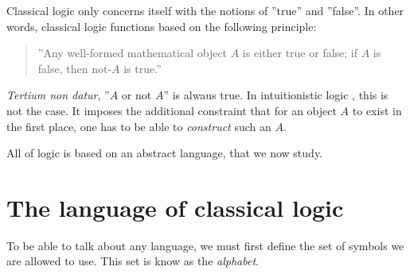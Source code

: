 \documentclass[11pt,a4paper]{article}
\begin{document}
Classical logic \LK{} only concerns itself with the notions of ''true'' and ''false''.
In other words, classical logic functions based on the following principle:
\begin{quote}
    ''Any well-formed mathematical object \(A\) is either true or false;
    if \(A\) is false, then not-\(A\) is true.''
\end{quote}
\emph{Tertium non datur}, ''\(A\) or not \(A\)'' is alwaus true.
In intuitionistic logic \IK, this is not the case.
It imposes the additional constraint that for an object \(A\)
to exist in the first place, one has to be able to \emph{construct}
such an \(A\).

All of logic is based on an abstract language, that we now study.

\section{The language of classical logic \LK}

To be able to talk about any language, we must first define the set of symbols we are allowed to use.
This set is know as the \emph{alphabet}.
\end{document}
